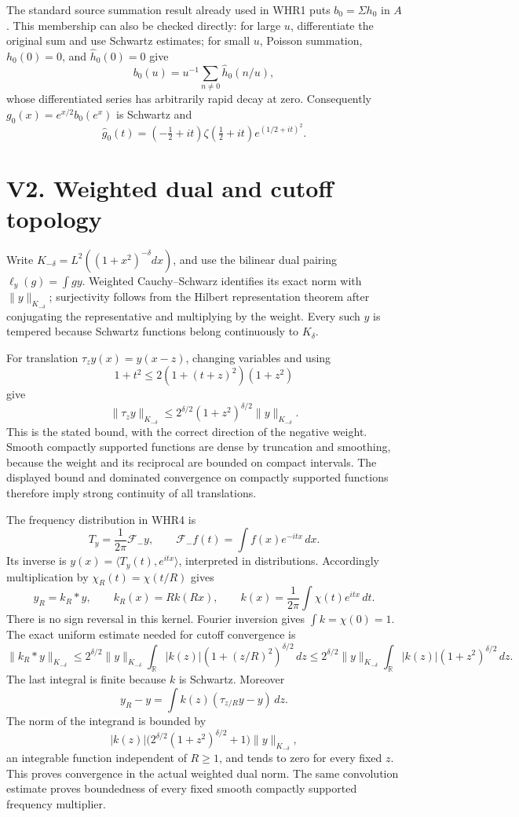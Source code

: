 The standard source summation result already used in WHR1 puts
\(b_0=\Sigma h_0\) in \(A\). This membership can also be checked
directly: for large \(u\), differentiate the original sum and use
Schwartz estimates; for small \(u\), Poisson summation, \(h_0(0)=0\),
and \(\widehat h_0(0)=0\) give \[
b_0(u)=u^{-1}\sum_{n\ne0}\widehat h_0(n/u),
\] whose differentiated series has arbitrarily rapid decay at zero.
Consequently \(g_0(x)=e^{x/2}b_0(e^x)\) is Schwartz and \[
\widehat g_0(t)=(-\tfrac12+it)\zeta(\tfrac12+it)e^{(1/2+it)^2}.
\]

\section{V2. Weighted dual and cutoff
topology}\label{v2.-weighted-dual-and-cutoff-topology}

Write \(K_{-\delta}=L^2((1+x^2)^{-\delta}dx)\), and use the bilinear
dual pairing \(\ell_y(g)=\int gy\). Weighted Cauchy--Schwarz identifies
its exact norm with \(\|y\|_{K_{-\delta}}\); surjectivity follows from
the Hilbert representation theorem after conjugating the representative
and multiplying by the weight. Every such \(y\) is tempered because
Schwartz functions belong continuously to \(K_\delta\).

For translation \(\tau_z y(x)=y(x-z)\), changing variables and using \[
1+t^2\leq2(1+(t+z)^2)(1+z^2)
\] give \[
\|\tau_z y\|_{K_{-\delta}}
\leq2^{\delta/2}(1+z^2)^{\delta/2}\|y\|_{K_{-\delta}}.
\] This is the stated bound, with the correct direction of the negative
weight. Smooth compactly supported functions are dense by truncation and
smoothing, because the weight and its reciprocal are bounded on compact
intervals. The displayed bound and dominated convergence on compactly
supported functions therefore imply strong continuity of all
translations.

The frequency distribution in WHR4 is \[
T_y=\frac1{2\pi}\mathcal F_-y,
\qquad \mathcal F_-f(t)=\int f(x)e^{-itx}\,dx.
\] Its inverse is \(y(x)=\langle T_y(t),e^{itx}\rangle\), interpreted in
distributions. Accordingly multiplication by \(\chi_R(t)=\chi(t/R)\)
gives \[
y_R=k_R*y,\qquad
k_R(x)=Rk(Rx),\qquad
k(x)=\frac1{2\pi}\int\chi(t)e^{itx}\,dt.
\] There is no sign reversal in this kernel. Fourier inversion gives
\(\int k=\chi(0)=1\). The exact uniform estimate needed for cutoff
convergence is \[
\|k_R*y\|_{K_{-\delta}}
\leq 2^{\delta/2}\|y\|_{K_{-\delta}}
\int_{\mathbb R}|k(z)|(1+(z/R)^2)^{\delta/2}\,dz
\leq 2^{\delta/2}\|y\|_{K_{-\delta}}
\int_{\mathbb R}|k(z)|(1+z^2)^{\delta/2}\,dz.
\] The last integral is finite because \(k\) is Schwartz. Moreover \[
y_R-y=\int k(z)(\tau_{z/R}y-y)\,dz.
\] The norm of the integrand is bounded by \[
|k(z)|\bigl(2^{\delta/2}(1+z^2)^{\delta/2}+1\bigr)
\|y\|_{K_{-\delta}},
\] an integrable function independent of \(R\ge1\), and tends to zero
for every fixed \(z\). This proves convergence in the actual weighted
dual norm. The same convolution estimate proves boundedness of every
fixed smooth compactly supported frequency multiplier.

